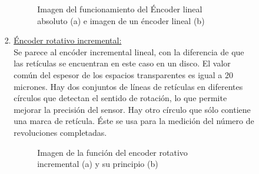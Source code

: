 \begin{enumerate}
\begin{enumerate}
\begin{enumerate}
\begin{enumerate}
\begin{figure}[h]
{					}
					\caption{Imagen del funcionamiento del Éncoder lineal absoluto (a) e imagen de un éncoder lineal (b)}
					\label{fig:Encoders lineales}
				\end{figure}
				
				\item \underline{Éncoder rotativo incremental:} \\
				Se parece al encóder incremental lineal, con la diferencia
				de que las retículas se encuentran en este caso en un disco. El valor común del espesor de los espacios transparentes es igual a 20 micrones. Hay dos conjuntos de líneas de retículas en diferentes círculos que detectan el sentido de rotación, lo que permite mejorar la precisión del sensor. Hay otro círculo que sólo contiene una marca de retícula. Éste se usa para la medición del número
				de revoluciones completadas.\cite{saha2010robotics}
				\\
				\begin{figure}[h]
	\centering
	\hfill
	\caption{Imagen de la función del encoder rotativo incremental (a) y su principio (b)}
	\label{fig:Encoders}
\end{figure}				
\\
\\
\\
\\
\\
\\


\end{enumerate}
\end{enumerate}
\end{enumerate}
\end{enumerate}
